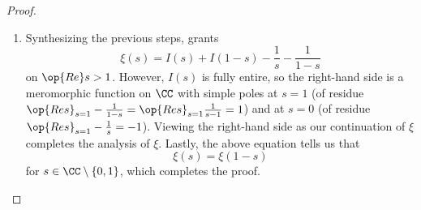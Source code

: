 \documentclass[../notes.tex]{subfiles}
\begin{document}
\begin{proof}
\begin{enumerate}
		\item Synthesizing the previous steps,  grants
		\[\xi(s)=I(s)+I(1-s)-\frac1s-\frac1{1-s}\]
		on $\op{Re}s>1$. However, $I(s)$ is fully entire, so the right-hand side is a meromorphic function on $\CC$ with simple poles at $s=1$ (of residue $\op{Res}_{s=1}-\frac1{1-s}=\op{Res}_{s=1}\frac1{s-1}=1$) and at $s=0$ (of residue $\op{Res}_{s=1}-\frac1s=-1$). Viewing the right-hand side as our continuation of $\xi$ completes the analysis of $\xi$. Lastly, the above equation tells us that
		\[\xi(s)=\xi(1-s)\]
		for $s\in\CC\setminus\{0,1\}$, which completes the proof.
		\qedhere
	\end{enumerate}
\end{proof}
\end{document}
